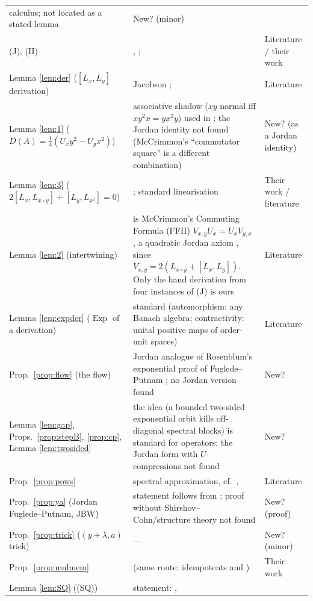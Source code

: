 \documentclass[11pt]{article}
\theoremstyle{remark}
\newcommand{\jp}{\circ}
\DeclareMathOperator{\Exp}{Exp}
\begin{document}
\begin{longtable}{>{\raggedright}p{4.1cm}>{\raggedright}p{7.6cm}>{\raggedright\arraybackslash}p{2.9cm}}
calculus; not located as a stated lemma & New? (minor)\\
(J), (II) & \cite[\S2.4]{HOS}, \cite{Jac68}; \cite[Lemma~2.4(c), Prop.~2.5]{vdW} &
Literature / their work\\
Lemma \ref{lem:der} ($[L_x,L_y]$ derivation) & Jacobson \cite{Jac49}; \cite[Problem
II.3.6(3), Ch.~III.22.1]{McC} & Literature\\
Lemma \ref{lem:1} ($D(A) = \frac14(U_xy^2-U_yx^2)$) & associative shadow ($xy$ normal
iff $xy^2x = yx^2y$) used in \cite[Props.~3.2, 3.3]{vdW}; the Jordan identity not found
(McCrimmon's ``commutator square'' \cite[22.1.1]{McC} is a different combination) &
New? (as a Jordan identity)\\
Lemma \ref{lem:3} ($2[L_x,L_{x\jp y}] + [L_y,L_{x^2}] = 0$) & \cite[Lemma~2.4(b)]{vdW};
standard linearisation & Their work / literature\\
Lemma \ref{lem:2} (intertwining) & is McCrimmon's Commuting Formula (FFII)
$V_{x,y}U_x = U_xV_{y,x}$ \cite[5.2.3]{McC}, a quadratic Jordan axiom
\cite{McC66,Jac69}, since $V_{x,y} = 2(L_{x\jp y}+[L_x,L_y])$. Only the hand derivation
from four instances of (J) is ours & Literature\\
Lemma \ref{lem:expder} ($\Exp$ of a derivation) & standard (automorphism: any Banach
algebra; contractivity: unital positive maps of order-unit spaces) & Literature\\
Prop.~\ref{prop:flow} (the flow) & Jordan analogue of Rosenblum's exponential proof of
Fuglede--Putnam \cite{Ros58}; no Jordan version found & New?\\
Lemma \ref{lem:gap}, Props.~\ref{prop:stepB}, \ref{prop:cp}, Lemma \ref{lem:twosided} &
the idea (a bounded two-sided exponential orbit kills off-diagonal spectral blocks) is
standard for operators; the Jordan form with $U$-compressions not found & New?\\
Prop.~\ref{prop:pows} & spectral approximation, cf.\ \cite[4.2.3]{HOS},
\cite[Props.~2.33--2.35]{vdW} & Literature\\
Prop.~\ref{prop:ya} (Jordan Fuglede--Putnam, JBW) & statement follows from
\cite[Thm.~3.12]{vdW}; proof without Shirshov--Cohn/structure theory not found &
New? (proof)\\
Prop.~\ref{prop:trick} ($(y+\lambda,a)$ trick) & --- & New? (minor)\\
Prop.~\ref{prop:mulmem} & \cite[Prop.~2.34]{vdW} (same route: idempotents and
\cite{Jac89}) & Their work\\
Lemma \ref{lem:SQ} ((SQ)) & statement: \cite[Thm.~3.13, (a)$\Leftrightarrow$(d)]{vdW},

\end{longtable}
\end{document}
